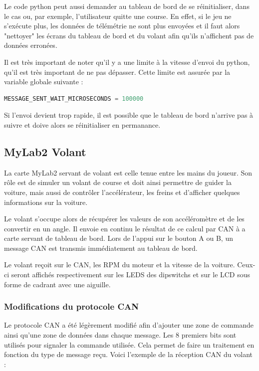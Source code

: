 \documentclass[french, 11pt]{article}
\begin{document}
			Le code python peut aussi demander au tableau de bord de se réinitialiser, dans le cas ou, par exemple, l'utilisateur quitte une course. En effet, si le jeu ne s'exécute plus, les données de télémétrie ne sont plus envoyées et il faut alors "nettoyer" les écrans du tableau de bord et du volant afin qu'ils n'affichent pas de données erronées.


			Il est très important de noter qu'il y a une limite à la vitesse d'envoi du python, qu'il est très important de ne pas dépasser. Cette limite est assurée par la variable globale suivante : 

\begin{lstlisting}[language=python, caption=Variable de ralentissement de l'envoi des données par le python]
MESSAGE_SENT_WAIT_MICROSECONDS = 100000
\end{lstlisting}

		Si l'envoi devient trop rapide, il est possible que le tableau de bord n'arrive pas à suivre et doive alors se réinitialiser en permanance.

        \subsection{MyLab2 Volant}

		La carte MyLab2 servant de volant est celle tenue entre les mains du joueur. Son rôle est de simuler un volant de course et doit ainsi permettre de guider la voiture, mais aussi de contrôler l'accélérateur, les freins et d'afficher quelques informations sur la voiture.

        Le volant s'occupe alors de récupérer les valeurs de son accéléromètre et de les convertir en un angle. Il envoie en continu le résultat de ce calcul par CAN à a carte servant de tableau de bord. Lors de l'appui sur le bouton A ou B, un message CAN est transmis immédiatement au tableau de bord. 
		
		Le volant reçoit sur le CAN, les RPM du moteur et la vitesse de la voiture. Ceux-ci seront affichés respectivement sur les LEDS des dipswitchs et sur le LCD sous forme de cadrant avec une aiguille. 

		\subsubsection{Modifications du protocole CAN}
		\label{CAN}

		Le protocole CAN a été légèrement modifié afin d'ajouter une zone de commande ainsi qu'une zone de données dans chaque message. Les 8 premiers bits sont utilisés pour signaler la commande utilisée. Cela permet de faire un traitement en fonction du type de message reçu. Voici l'exemple de la réception CAN du volant : 
\end{document}
